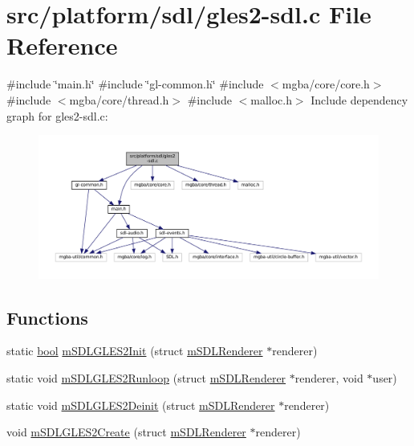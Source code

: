 \hypertarget{gles2-sdl_8c}{}\section{src/platform/sdl/gles2-\/sdl.c File Reference}
\label{gles2-sdl_8c}
{\ttfamily \#include \char`\"{}main.\+h\char`\"{}}\newline
{\ttfamily \#include \char`\"{}gl-\/common.\+h\char`\"{}}\newline
{\ttfamily \#include $<$mgba/core/core.\+h$>$}\newline
{\ttfamily \#include $<$mgba/core/thread.\+h$>$}\newline
{\ttfamily \#include $<$malloc.\+h$>$}\newline
Include dependency graph for gles2-\/sdl.c\+:
\nopagebreak
\begin{figure}[H]
\begin{center}
\leavevmode
\includegraphics[width=350pt]{gles2-sdl_8c__incl}
\end{center}
\end{figure}
\subsection*{Functions}
\begin{DoxyCompactItemize}
\item 
static \mbox{\hyperlink{libretro_8h_a4a26dcae73fb7e1528214a068aca317e}{bool}} \mbox{\hyperlink{gles2-sdl_8c_a454611060aa8f426a7550bec2ef034b5}{m\+S\+D\+L\+G\+L\+E\+S2\+Init}} (struct \mbox{\hyperlink{structm_s_d_l_renderer}{m\+S\+D\+L\+Renderer}} $\ast$renderer)
\item 
static void \mbox{\hyperlink{gles2-sdl_8c_a2c8ab44370fc9aa148f328f7f4478b6e}{m\+S\+D\+L\+G\+L\+E\+S2\+Runloop}} (struct \mbox{\hyperlink{structm_s_d_l_renderer}{m\+S\+D\+L\+Renderer}} $\ast$renderer, void $\ast$user)
\item 
static void \mbox{\hyperlink{gles2-sdl_8c_a2d06ef5baf7a055c8ff28c80eb81b55c}{m\+S\+D\+L\+G\+L\+E\+S2\+Deinit}} (struct \mbox{\hyperlink{structm_s_d_l_renderer}{m\+S\+D\+L\+Renderer}} $\ast$renderer)
\item 
void \mbox{\hyperlink{gles2-sdl_8c_a1940d2984f689899b148f24b7ab39e48}{m\+S\+D\+L\+G\+L\+E\+S2\+Create}} (struct \mbox{\hyperlink{structm_s_d_l_renderer}{m\+S\+D\+L\+Renderer}} $\ast$renderer)
\end{DoxyCompactItemize}


